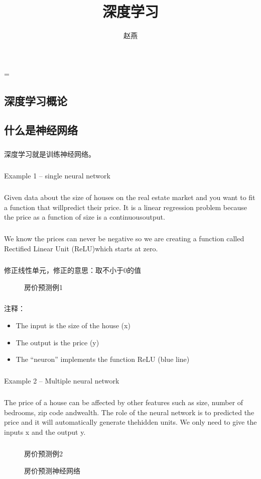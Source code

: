 \documentclass{article}
\begin{document}
 
\hfuzz=\maxdimen
{}
\begin{CJK}{UTF8}{gbsn}  
\title{深度学习}
\author{赵燕}
\date{}
\maketitle
\renewcommand\figurename{图}

\section{深度学习概论}
\subsection{什么是神经网络}
\subparagraph{}
深度学习就是训练神经网络。
\subparagraph{}
Example 1 – single neural network
\subparagraph{}
Given data about the size of houses on the real estate market and you want to fit a function that willpredict their price. It is a linear regression problem because the price as a function of size is a continuousoutput.
\subparagraph{}
We know the prices can never be negative so we are creating a function called Rectified Linear Unit (ReLU)which starts at zero.
\subparagraph{}
修正线性单元，修正的意思：取不小于0的值
\begin{figure}[H]
\caption{房价预测例1}
\label{fig:1101}
\end{figure}
\subparagraph{}
注释：
\begin{itemize}
\item The input is the size of the house (x)
\item The output is the price (y)
\item The “neuron” implements the function ReLU (blue line)
\end{itemize}
\subparagraph{}
Example 2 – Multiple neural network
\subparagraph{}
The price of a house can be affected by other features such as size, number of bedrooms, zip code andwealth. The role of the neural network is to predicted the price and it will automatically generate thehidden units. We only need to give the inputs x and the output y.
\subparagraph{}
\begin{figure}[H]
\caption{房价预测例2}
\label{fig:1102}
\end{figure}
\begin{figure}[H]
\caption{房价预测神经网络}
\label{fig:1103}
\end{figure}

\end{CJK}
\end{document}
